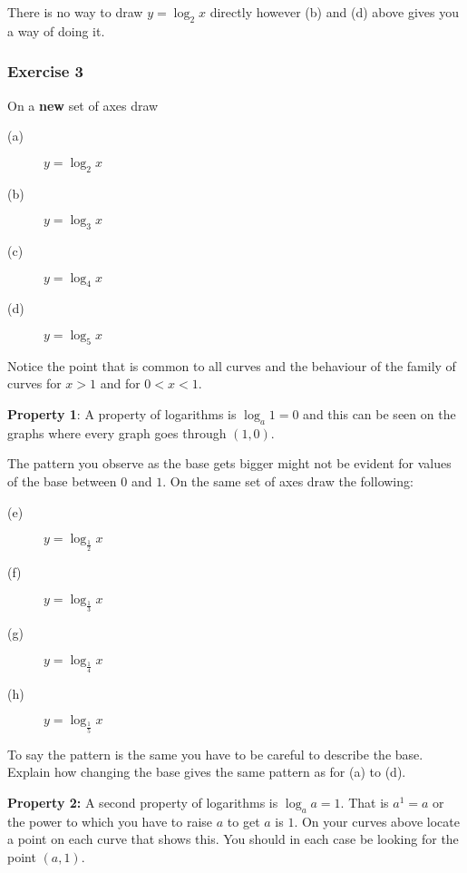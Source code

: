 There is no way to draw $y =\log _{2} x$ directly however (b) and (d) above gives you a way of doing it. 

\subsubsection{Exercise 3}
On a \textbf{new} set of axes draw 


\begin{description}
\item [(a)] $y =\log _{2} x$ 

\item [(b)] $y =\log _{3} x$ 

\item [(c)] $y =\log _{4} x$ 

\item [(d)] $y =\log _{5} x$ \end{description}

Notice the point that is common to all curves and the behaviour
of the family of curves for $x >1$ and for $0 <x <1$. 

\textbf{Property 1}: A property of logarithms is $\log _{a} 1 =0$ and this can be seen on the graphs where every graph goes through $\left (1 ,0\right )$. 

The pattern you observe as the base gets
bigger might not be evident for values of the base between $0$ and $1$. On the same set of axes draw the following: 


\begin{description}
\item [(e)] $y =\log _{\frac{1}{2}} x$ 

\item [(f)] $y =\log _{\frac{1}{3}} x$ 

\item [(g)] $y =\log _{\frac{1}{4}} x$ 

\item [(h)] $y =\log _{\frac{1}{5}} x$ \end{description}

To say the pattern is the same you have to be careful to describe
the base. Explain how changing the base gives the same pattern as for (a) to (d).


\textbf{Property 2:} A second property of logarithms is $\log _{a} a =1$. That is $a^{1} =a$ or the power to which you have to raise $a$ to get $a$ is $1$. On your curves above locate a point on each curve that shows this. You
should in each case be looking for the point $\left (a ,1\right )$. 

